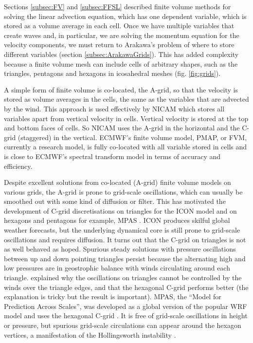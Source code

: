 Sections \ref{subsec:FV} and \ref{subsec:FFSL} described finite
volume methods for solving the linear advection equation, which has
one dependent variable, which is stored as a volume average in each
cell. Once we have multiple variables that create waves and, in particular,
we are solving the momentum equation for the velocity components,
we must return to Arakawa's problem of where to store different variables
(section \ref{subsec:ArakawaGrids}). This has added complexity because
a finite volume mesh can include cells of arbitrary shapes, such as
the triangles, pentagons and hexagons in icosahedral meshes (fig.
\ref{fig:grids}). 

A simple form of finite volume is co-located, the A-grid, so that
the velocity is stored as volume averages in the cells, the same as
the variables that are advected by the wind. This approach is used
effectively by NICAM \citep{SMT+08} which stores all variables apart
from vertical velocity in cells. Vertical velocity is stored at the
top and bottom faces of cells. So NICAM uses the A-grid in the horizontal
and the C-grid (staggered) in the vertical. ECMWF's finite volume
model, PMAP, or FVM, currently a research model, is fully co-located
with all variable stored in cells \citep{KDK+19} and is close to
ECMWF's spectral transform model in terms of accuracy and efficiency. 

Despite excellent solutions from co-located (A-grid) finite volume
models on various grids, the A-grid is prone to grid-scale oscillations,
which can usually be smoothed out with some kind of diffusion or filter.
This has motivated the development of C-grid discretisations on triangles
for the ICON model \citep{Bon04,ZRR+15} and on hexagons and pentagons
for example, MPAS \citep{TRSK09,SKD+12,RPH+13}. ICON produces skilful
global weather forecasts, but the underlying dynamical core is still
prone to grid-scale oscillations and requires diffusion. It turns
out that the C-grid on triangles is not as well behaved as hoped.
Spurious steady solutions with pressure oscillations between up and
down pointing triangles persist because the alternating high and low
pressures are in geostrophic balance with winds circulating around
each triangle. \citet{Gas11} explained why the oscillations on triangles
cannot be controlled by the winds over the triangle edges, and that
the hexagonal C-grid performs better (the explanation is tricky but
the result is important). MPAS, the ``Model for Prediction Across
Scales'', was developed as a global version of the popular WRF model
and uses the hexagonal C-grid \citep{SKD+12}. It is free of grid-scale
oscillations in height or pressure, but spurious grid-scale circulations
can appear around the hexagon vertices, a manifestation of the Hollingsworth
instability \citep{Gas13}. 

